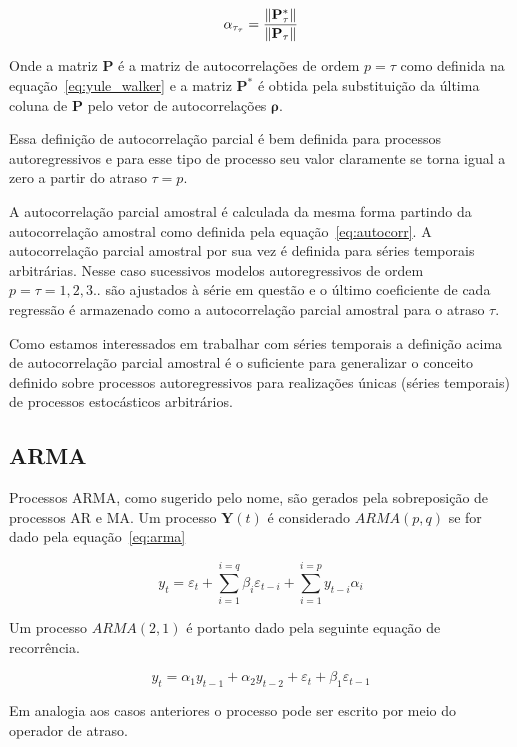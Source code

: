 $$ \alpha_{\tau_{\tau}} = \frac{\lVert\mathbf{P}^*_{\tau}\rVert}{\lVert\mathbf{P}_{\tau}\rVert} $$

Onde a matriz $\mathbf{\mathbf{P}}$ é a matriz de autocorrelações de ordem $p =
\tau$ como definida na equação~\ref{eq:yule_walker} e a matriz
$\mathbf{P}^*$ é obtida pela substituição da última coluna de
$\mathbf{P}$ pelo vetor de autocorrelações $\mathbf{\rho}$.

Essa definição de autocorrelação parcial é bem definida para processos
autoregressivos e para esse tipo de processo seu valor claramente se torna
igual a zero a partir do atraso $\tau = p$.

A autocorrelação parcial amostral é calculada da mesma forma partindo da
autocorrelação amostral como definida pela equação~\ref{eq:autocorr}. A
autocorrelação parcial amostral por sua vez é definida para séries temporais
arbitrárias. Nesse caso sucessivos modelos autoregressivos de ordem $p = \tau =
1, 2, 3..$ são ajustados à série em questão e o último coeficiente
de cada regressão é armazenado como a autocorrelação parcial amostral para o
atraso $\tau$.

Como estamos interessados em trabalhar com séries temporais a definição acima
de autocorrelação parcial amostral é o suficiente para generalizar o conceito
definido sobre processos autoregressivos para realizações únicas (séries
temporais) de processos estocásticos arbitrários.

\subsection{ARMA}
\label{ssec:ARMA}

Processos ARMA, como sugerido pelo nome, são gerados pela sobreposição de
processos AR e MA. Um processo ${\mathbf{Y}}(t)$ é considerado $ARMA(p, q)$ se
for dado pela equação~\ref{eq:arma}

\begin{equation}\label{eq:arma}
    y_t = \varepsilon_t + \sum_{i=1}^{i=q} \beta_i \varepsilon_{t-i} + \sum_{i=1}^{i=p} y_{t-i}\alpha_i
\end{equation}

Um processo $ARMA(2, 1)$ é portanto dado pela seguinte equação de recorrência.

$$ y_t = \alpha_1 y_{t-1} + \alpha_2 y_{t-2} + \varepsilon_{t} + \beta_1 \varepsilon_{t-1} $$

Em analogia aos casos anteriores o processo pode ser escrito por meio do
operador de atraso.

